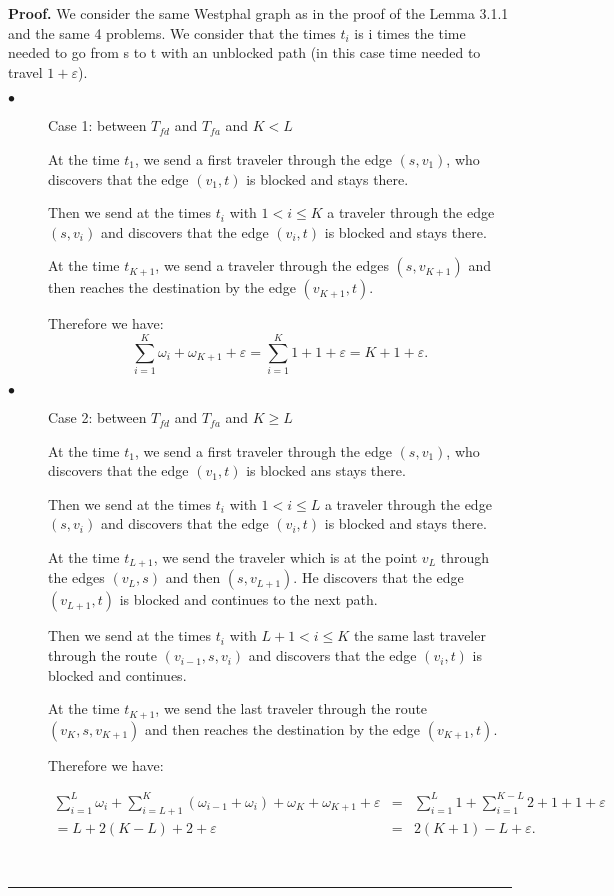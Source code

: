 \documentclass[a4paper, 10pt]{article}
\newenvironment{proof}[1][Proof]{\textbf{#1.} }{\ \rule{0.5em}{0.5em}}
\begin{document}
\begin{proof} We consider the same Westphal graph as in the proof of the Lemma 3.1.1 and the same 4 problems. We consider that the times $t_i$ is i times the time needed to go from s to t with an unblocked path (in this case time needed to travel $1 + \varepsilon$). 

\begin{description}
\item[$\bullet$] Case 1: between $T_{fd}$ and $T_{fa}$ and $K<L$

At the time $t_1$, we send a first traveler through the edge $(s,v_1)$, who discovers that the edge $(v_1,t)$ is blocked and stays there.

Then we send at the times $t_i$ with $1 < i \leq K$ a traveler through the edge $(s,v_i)$ and discovers that the edge $(v_i,t)$ is blocked and stays there.

At the time $t_{K+1}$, we send a traveler through the edges $(s,v_{K+1})$ and then reaches the destination by the edge $(v_{K+1},t)$. 

Therefore we have: 
\[
\sum_{i=1}^{K} \omega_{i} + \omega_{K+1} + \varepsilon = \sum_{i=1}^{K} 1 + 1 + \varepsilon = K + 1 + \varepsilon.
\]

\item[$\bullet$] Case 2: between $T_{fd}$ and $T_{fa}$ and $K \geq L$

At the time $t_1$, we send a first traveler through the edge $(s,v_1)$, who discovers that the edge $(v_1,t)$ is blocked ans stays there.

Then we send at the times $t_i$ with $1 < i \leq L$ a traveler through the edge $(s,v_i)$ and discovers that the edge $(v_i,t)$ is blocked and stays there.

At the time $t_{L+1}$, we send the traveler which is at the point $v_L$ through the edges $(v_{L},s)$ and then $(s,v_{L+1})$. He discovers that the edge $(v_{L+1},t)$ is blocked and continues to the next path.

Then we send at the times $t_i$ with $L+1 < i \leq K$ the same last traveler through the route $(v_{i-1},s,v_i)$ and discovers that the edge $(v_i,t)$ is blocked and continues.

At the time $t_{K+1}$, we send the last traveler through the route $(v_K,s,v_{K+1})$ and then reaches the destination by the edge $(v_{K+1},t)$. 

Therefore we have: 

\begin{eqnarray}
\sum_{i=1}^{L} \omega_{i} + \sum_{i=L+1}^{K}(\omega_{i-1} + \omega_{i} ) + \omega_{K} + \omega_{K+1} + \varepsilon
&=&\sum_{i=1}^{L} 1 + \sum_{i=1}^{K-L}2 + 1 + 1 + \varepsilon \nonumber\\
= L + 2(K - L) + 2 + \varepsilon
&=& 2(K + 1 ) - L + \varepsilon.\nonumber
\end{eqnarray}


\end{description}
\end{proof}
\end{document}
